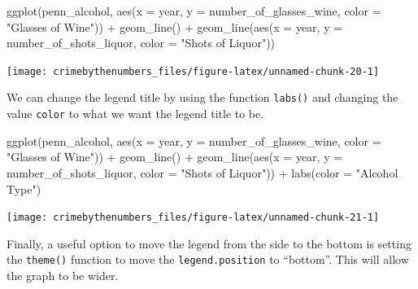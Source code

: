 \documentclass[
]{krantz}
\makeatletter
\newenvironment{Shaded}{\begin{snugshade}}{\end{snugshade}}
\newcommand{\AttributeTok}[1]{\textcolor[rgb]{0.61,0.61,0.61}{#1}}
\newcommand{\FunctionTok}[1]{\textcolor[rgb]{0,0,0}{#1}}
\newcommand{\NormalTok}[1]{#1}
\newcommand{\SpecialCharTok}[1]{\textcolor[rgb]{0,0,0}{#1}}
\newcommand{\StringTok}[1]{\textcolor[rgb]{0.5,0.5,0.5}{#1}}
\newenvironment{kframe}{%
\medskip{}
\setlength{\fboxsep}{.8em}
 \def\at@end@of@kframe{}%
 \ifinner\ifhmode%
  \def\at@end@of@kframe{\end{minipage}}%
  \begin{minipage}{\columnwidth}%
 \fi\fi%
 \def\FrameCommand##1{\hskip\@totalleftmargin \hskip-\fboxsep
 \colorbox{shadecolor}{##1}\hskip-\fboxsep
     \hskip-\linewidth \hskip-\@totalleftmargin \hskip\columnwidth}%
 \MakeFramed {\advance\hsize-\width
   \@totalleftmargin\z@ \linewidth\hsize
   \@setminipage}}%
 {\par\unskip\endMakeFramed%
 \at@end@of@kframe}
\renewenvironment{Shaded}{\begin{kframe}}{\end{kframe}}
\makeatother
\begin{document}
\begin{Shaded}
\begin{Highlighting}[]
\FunctionTok{ggplot}\NormalTok{(penn\_alcohol, }\FunctionTok{aes}\NormalTok{(}\AttributeTok{x =}\NormalTok{ year, }\AttributeTok{y =}\NormalTok{ number\_of\_glasses\_wine,}
                         \AttributeTok{color =} \StringTok{"Glasses of Wine"}\NormalTok{)) }\SpecialCharTok{+}
  \FunctionTok{geom\_line}\NormalTok{() }\SpecialCharTok{+}
  \FunctionTok{geom\_line}\NormalTok{(}\FunctionTok{aes}\NormalTok{(}\AttributeTok{x =}\NormalTok{ year, }\AttributeTok{y =}\NormalTok{ number\_of\_shots\_liquor,}
                \AttributeTok{color =} \StringTok{"Shots of Liquor"}\NormalTok{))}
\end{Highlighting}
\end{Shaded}

\begin{center}\texttt{[image: crimebythenumbers\_files/figure-latex/unnamed-chunk-20-1]} \end{center}

We can change the legend title by using the function \texttt{labs()} and changing the value \texttt{color} to what we want the legend title to be.

\begin{Shaded}
\begin{Highlighting}[]
\FunctionTok{ggplot}\NormalTok{(penn\_alcohol, }\FunctionTok{aes}\NormalTok{(}\AttributeTok{x =}\NormalTok{ year, }\AttributeTok{y =}\NormalTok{ number\_of\_glasses\_wine,}
                         \AttributeTok{color =} \StringTok{"Glasses of Wine"}\NormalTok{)) }\SpecialCharTok{+}
  \FunctionTok{geom\_line}\NormalTok{() }\SpecialCharTok{+}
  \FunctionTok{geom\_line}\NormalTok{(}\FunctionTok{aes}\NormalTok{(}\AttributeTok{x =}\NormalTok{ year, }\AttributeTok{y =}\NormalTok{ number\_of\_shots\_liquor,}
                \AttributeTok{color =} \StringTok{"Shots of Liquor"}\NormalTok{)) }\SpecialCharTok{+}
  \FunctionTok{labs}\NormalTok{(}\AttributeTok{color =} \StringTok{"Alcohol Type"}\NormalTok{)}
\end{Highlighting}
\end{Shaded}

\begin{center}\texttt{[image: crimebythenumbers\_files/figure-latex/unnamed-chunk-21-1]} \end{center}

Finally, a useful option to move the legend from the side to the bottom is setting the \texttt{theme()} function to move the \texttt{legend.position} to ``bottom''. This will allow the graph to be wider.
\end{document}
